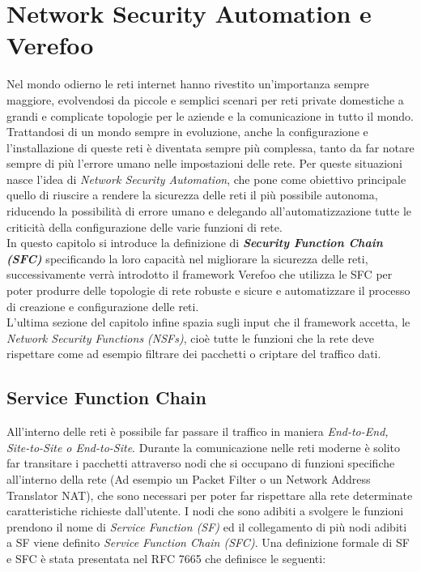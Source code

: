 

\chapter{Network Security Automation e Verefoo} \label{ch:verefoo}




Nel mondo odierno le reti internet hanno rivestito un'importanza sempre maggiore, evolvendosi da piccole e semplici scenari per reti private domestiche
a grandi e complicate topologie per le aziende e la comunicazione in tutto il mondo. Trattandosi di un mondo sempre in evoluzione, anche la configurazione e
l'installazione di queste reti è diventata sempre più complessa, tanto da far notare sempre di più l'errore umano nelle impostazioni delle rete.
Per queste situazioni nasce l'idea di \textit{Network Security Automation}, che pone come obiettivo principale quello di riuscire a rendere la sicurezza delle reti
il più possibile autonoma, riducendo la possibilità di errore umano e delegando all'automatizzazione tutte le criticità della configurazione delle varie funzioni di rete.\\
In questo capitolo si introduce la definizione di \textbf{\textit{Security Function Chain (SFC)}} specificando la loro capacità nel migliorare la sicurezza delle reti,
successivamente verrà introdotto il framework Verefoo che utilizza le SFC per poter produrre delle topologie di rete robuste e sicure e automatizzare il processo di creazione e configurazione delle reti\cite{cit3}.\\
L'ultima sezione del capitolo infine spazia sugli input che il framework accetta, le \textit{Network Security Functions (NSFs)}, cioè tutte le funzioni che la rete deve rispettare come ad esempio filtrare dei pacchetti
o criptare del traffico dati. 


\section{Service Function Chain} 

All'interno delle reti è possibile far passare il traffico in maniera \textit{End-to-End, Site-to-Site o End-to-Site}.
Durante la comunicazione nelle reti moderne è solito far transitare i pacchetti attraverso nodi che si occupano di funzioni specifiche all'interno della
rete (Ad esempio un Packet Filter o un Network Address Translator NAT), che sono necessari per poter far rispettare alla rete determinate caratteristiche richieste dall'utente.
I nodi che sono adibiti a svolgere le funzioni prendono il nome di \textit{Service Function (SF)} ed il collegamento di più nodi adibiti a SF viene definito 
\textit{Service Function Chain (SFC)}. Una definizione formale di SF e SFC è stata presentata nel RFC 7665 \cite{rfc7665} 
che definisce le seguenti:

